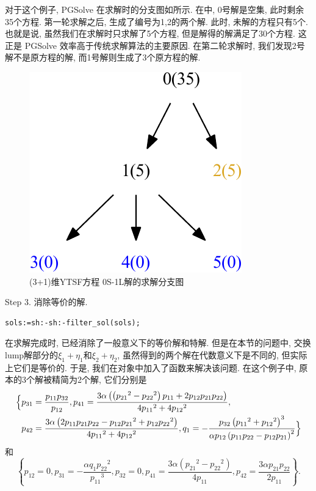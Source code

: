 对于这个例子, PGSolve 在求解时的分支图如所示. 在中, 0号解是空集, 此时剩余35个方程. 第一轮求解之后, 生成了编号为1,2的两个解. 此时, 未解的方程只有5个. 也就是说, 虽然我们在求解时只求解了5个方程, 但是解得的解满足了30个方程. 这正是 PGSolve 效率高于传统求解算法的主要原因. 在第二轮求解时, 我们发现2号解不是原方程的解, 而1号解则生成了3个原方程的解. 
\begin{figure}[htbp]
\centering
\includegraphics[width=.35\textwidth]{fig/0S1L.pdf}
\caption{(3+1)维YTSF方程 0S-1L解的求解分支图}\label{sb0}
\end{figure}

Step 3. 消除等价的解.
\begin{verbatim}
sols:=sh:-sh:-filter_sol(sols);
\end{verbatim}
在求解完成时, 已经消除了一般意义下的等价解和特解. 但是在本节的问题中, 交换lump解部分的$\xi_1+\eta_1$和$\xi_2+\eta_2$, 虽然得到的两个解在代数意义下是不同的, 但实际上它们是等价的. 于是, 我们在对象中加入了函数来解决该问题. 在这个例子中, 原本的3个解被精简为2个解, 它们分别是
\begin{equation}
\begin{aligned}
\Bigl\{ 
& p_{{31}}={\frac {p_{{11}}p_{{32}}}{p_{{12}}}}, 
p_{{41}}={\frac {3\alpha \left(  \left( {p_{{21}}}^{2}-{p_{{22}}}^{2} \right) p_{{11}}+2p_{{12}}p_{{21}}p_{{22}} \right) }{4{p_{{11}}}^{2}+4{p_{{12}}}^{2}}}, \\
& p_{{42}}={\frac {3\alpha \left( 2p_{{11}}p_{{21}}p_{{22}}-p_{{12}}{p_{{21}}}^{2}+p_{{12}}{p_{{22}}}^{2}\right) }{4{p_{{11}}}^{2}+4{p_{{12}}}^{2}}}, 
q_{{1}}=-{\frac {p_{{32}} \left( {p_{{11}}}^{2}+{p_{{12}}}^{2} \right) ^{3}}{\alpha p_{{12}} \left( p_{{11}}p_{{22}}-p_{{12}}p_{{21}} \right) ^{2}}} 
 \Bigr\} 
\end{aligned}
\label{0S1L-1}
\end{equation}
和
\begin{equation}
 \left\{ p_{{12}}=0,p_{{31}}=-{\frac {\alpha q_{{1}}{p_{{22}}}^{2}
}{{p_{{11}}}^{3}}},p_{{32}}=0,p_{{41}}={\frac {3\alpha
 \left( {p_{{21}}}^{2}-{p_{{22}}}^{2} \right) }{4p_{{11}}}},p_{{42}
}={\frac {3\alpha p_{{21}}p_{{22}}}{2p_{{11}}}} \right\} . \label{0S1L-2}
\end{equation}

